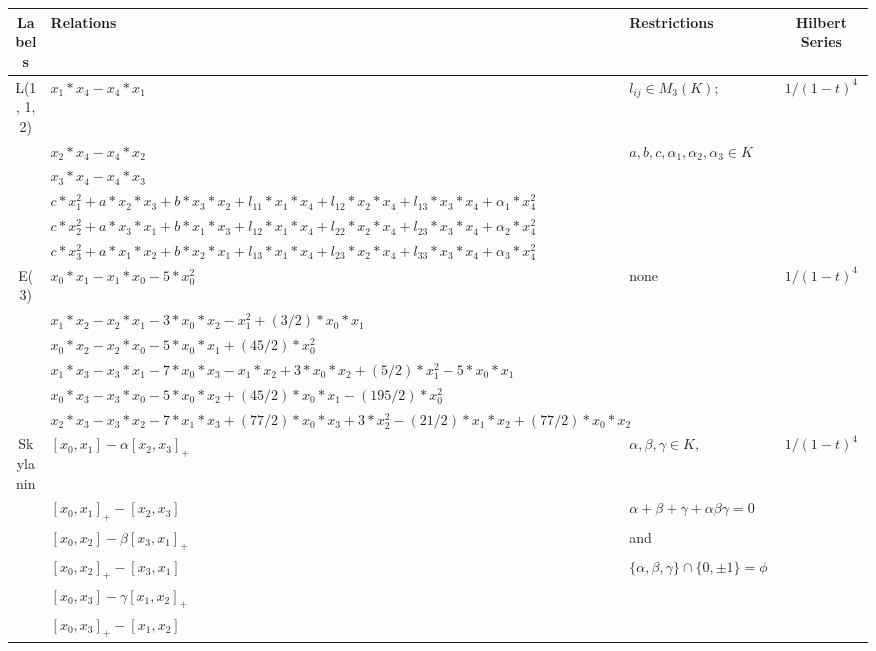 \documentclass[12]{article}
\begin{document}
\renewcommand{\arraystretch}{1.4}
\begin{longtable}[c]{|c|p{5.25cm}|p{3.25cm}|c|}
\toprule
 Labels & Relations & Restrictions & Hilbert Series \\ 
\endfirsthead 
  \hline
L(1, 1, 2)& $ x_1*x_4-x_4*x_1 $& $ l_{ij} \in  M_{3}(K);$  & \multirow{6}{*}{$ 1/(1-t)^4 $}\\ 
 & $ x_2*x_4-x_4*x_2 $ &$a,b,c,\alpha_{1},\alpha_{2},\alpha_{3}\in K$ &  \\ 
   & $ x_3*x_4-x_4*x_3 $ & & \\  
   & $ c*x_{1}^{2} + a*x_2*x_3 + b*x_3*x_2 + l_{11}*x_1*x_4 + l_{12}*x_2*x_4 + l_{13}*x_3*x_4 + \alpha_{1}*x_{4}^{2}	 $ & & \\  
   & $ c*x_{2}^{2} + a*x_3*x_1 + b*x_1*x_3 + l_{12}*x_1*x_4 + l_{22}*x_2*x_4 + l_{23}*x_{3}*x_4 + \alpha_{2}*x_{4}^{2} $ & & \\ 
   & $ c*x_{3}^{2} + a*x_1*x_2 + b*x_2*x_1 + l_{13}*x_1*x_4 + l_{23}*x_2*x_4 + l_{33}*x_3*x_4 + \alpha_{3}*x_{4}^{2} $ & &  \\  
\hline
E(3) & $ x_0 *x_1 - x_1 * x_0 - 5* x_{0}^{2} $  &\multirow{6}{*}{none} & \multirow{6}{*}{$ 1/(1-t)^4 $}\\ 
 &  $ x_1*x_2 - x_2*x_1 - 3*x_0*x_2 - x_{1}^{2} + (3/2)*x_0*x_1	
 $ & &  \\ 
   & $ x_0*x_2 - x_2*x_0 - 5*x_0*x_1 + (45/2)* x_{0}^{2}	
 $ & & \\  
   & $ x_1*x_3 - x_3*x_1 - 7*x_0*x_3 - x_1*x_2 + 3*x_0*x_2 + (5/2)*x_{1}^{2} - 5*x_0*x_1	
 $ & & \\  
   & $ x_0*x_3 - x_3*x_0 - 5*x_0*x_2 + (45/2)*x_0*x_1 - (195/2)* x_{0}^{2}	
 $ & & \\ 
   & $      x_2*x_3 - x_3*x_2 - 7*x_1*x_3 + (77/2)*x_0*x_3 + 3*x_{2}^{2} - (21/2)*x_1*x_2 + (77/2)*x_0*x_2
  $ & &  \\  
\hline
 Skylanin& $ [ x_0, x_1]  -  \alpha[x_2, x_3]_+$ &$ \alpha, \beta, \gamma \in K,$ &\multirow{6}{*}{$ 1/(1-t)^4 $} \\ 
& $ [x_0, x_1]_+  -  [x_2, x_3] $ &$\alpha + \beta + \gamma +\alpha \beta \gamma = 0 $ &  \\ 
   & $  [x_0, x_2] - \beta [x_3, x_1]_+ $ & and& \\  
   &  $  [x_0, x_2]_+ - [x_3, x_1] $ & $ \{ \alpha, \beta, \gamma \} \cap \{0, \pm1\} = \phi $& \\  
   & $  [x_0, x_3] - \gamma [x_1, x_2]_+ $ & & \\ 
   & $ [x_0, x_3]_+ - [x_1, x_2] $ & &  \\  

\end{longtable}
\end{document}
